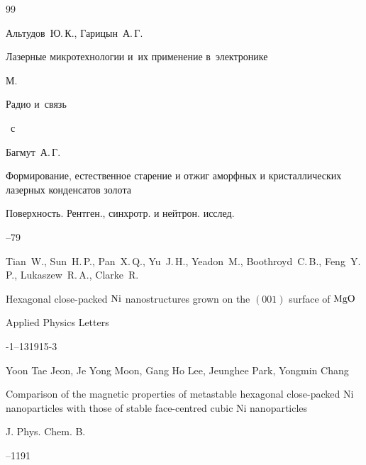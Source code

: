 \begin{thebibliography}{99}


\by Альтудов~Ю.\,К., Гарицын~А.\,Г.

\book Лазерные микротехнологии и~их применение в~электронике

\publaddr М.

\publ Радио и~связь


~с




\by Багмут~А.\,Г.

\paper Формирование, естественное старение и отжиг аморфных и кристаллических лазерных конденсатов золота

\jour Поверхность. Рентген., синхротр. и нейтрон. исслед.



--79





\by Tian~W., Sun~H.\,P., Pan~X.\,Q., Yu~J.\,H., Yeadon~M., Boothroyd~C.\,B., Feng~Y.\,P., Luka\-s\-zew~R.\,A., Clarke~R.

\paper Hexagonal close-packed $\rm Ni$ nanostructures grown on the $(001)$ surface of $\rm MgO$

\jour Applied Physics Letters




-1--131915-3




\by Yoon Tae Jeon, Je Yong Moon, Gang Ho Lee, Jeunghee Park, Yongmin Chang

\paper Comparison of the magnetic properties of metastable hexagonal close-packed Ni nanoparticles with those of stable face-centred cubic Ni nanoparticles

\jour J. Phys. Chem. B.




--1191




\end{thebibliography}
